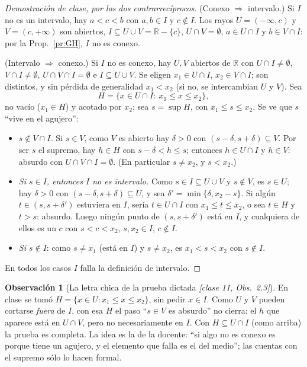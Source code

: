 \documentclass[11pt,a4paper]{article}
\newenvironment{lista}{\leavevmode\begin{itemize}[leftmargin=1.5em,itemsep=1pt,topsep=2pt,parsep=0pt]}{\end{itemize}}
\theoremstyle{definition}
\newtheorem{observacion}[definicion]{Observación}
\theoremstyle{plain}
\newcommand{\fnt}[1]{{\normalfont\small\itshape\color{gray!150!black}[#1]}}
\newcommand{\R}{\mathbb{R}}
\begin{document}
\begin{proof}[Demostración de clase, por los dos contrarrecíprocos]
(Conexo $\Rightarrow$ intervalo.) Si $I$ no es un intervalo, hay $a<c<b$ con $a,b\in I$ y $c\notin I$. Los rayos $U=(-\infty,c)$ y $V=(c,+\infty)$ son abiertos, $I\subseteq U\cup V=\R-\{c\}$, $U\cap V=\emptyset$, $a\in U\cap I$ y $b\in V\cap I$: por la Prop.~\ref{pr:GH}, $I$ no es conexo.

(Intervalo $\Rightarrow$ conexo.) Si $I$ no es conexo, hay $U,V$ abiertos de $\R$ con $U\cap I\ne\emptyset$, $V\cap I\ne\emptyset$, $U\cap V\cap I=\emptyset$ e $I\subseteq U\cup V$. Se eligen $x_1\in U\cap I$, $x_2\in V\cap I$; son distintos, y sin pérdida de generalidad $x_1<x_2$ (si no, se intercambian $U$ y $V$). Sea
\[
H=\{x\in U\cap I:\ x_1\le x\le x_2\},
\]
no vacío ($x_1\in H$) y acotado por $x_2$; sea $s=\sup H$, con $x_1\le s\le x_2$. Se ve que $s$ ``vive en el agujero'':
\begin{lista}
\item \emph{$s\notin V\cap I$.} Si $s\in V$, como $V$ es abierto hay $\delta>0$ con $(s-\delta,s+\delta)\subseteq V$. Por ser $s$ el supremo, hay $h\in H$ con $s-\delta<h\le s$; entonces $h\in U\cap I$ y $h\in V$: absurdo con $U\cap V\cap I=\emptyset$. (En particular $s\ne x_2$, y $s<x_2$.)
\item \emph{Si $s\in I$, entonces $I$ no es intervalo.} Como $s\in I\subseteq U\cup V$ y $s\notin V$, es $s\in U$; hay $\delta>0$ con $(s-\delta,s+\delta)\subseteq U$, y sea $\delta'=\min\{\delta,x_2-s\}$. Si algún $t\in(s,s+\delta')$ estuviera en $I$, sería $t\in U\cap I$ con $x_1\le t\le x_2$, o sea $t\in H$ y $t>s$: absurdo. Luego ningún punto de $(s,s+\delta')$ está en $I$, y cualquiera de ellos es un $c$ con $s<c<x_2$, $s,x_2\in I$, $c\notin I$.
\item \emph{Si $s\notin I$}: como $s\ne x_1$ (está en $I$) y $s\ne x_2$, es $x_1<s<x_2$ con $s\notin I$.
\end{lista}
En todos los casos $I$ falla la definición de intervalo.
\end{proof}

\begin{observacion}[La letra chica de la prueba dictada \fnt{clase 11, Obs.\ 2.3}]
En clase se tomó $H=\{x\in U: x_1\le x\le x_2\}$, sin pedir $x\in I$. Como $U$ y $V$ pueden cortarse \emph{fuera} de $I$, con esa $H$ el paso ``$s\in V$ es absurdo'' no cierra: el $h$ que aparece está en $U\cap V$, pero no necesariamente en $I$. Con $H\subseteq U\cap I$ (como arriba) la prueba es completa. La idea es la de la docente: ``si algo no es conexo es porque tiene un agujero, y el elemento que falla es el del medio''; las cuentas con el supremo sólo lo hacen formal.
\end{observacion}
\end{document}
